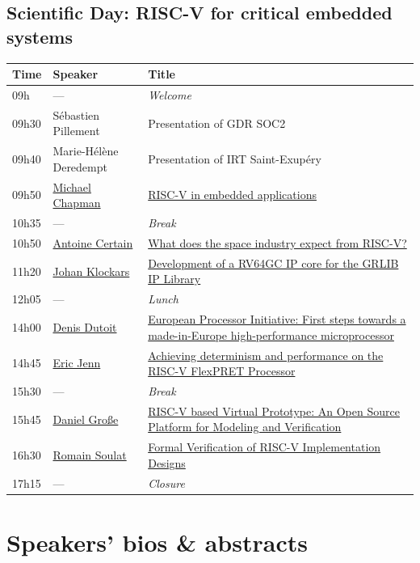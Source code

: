 \documentclass[a4paper, 10pt]{article}
\begin{document}
\subsection{Scientific Day: RISC-V for critical embedded systems}
\label{sec:orgc63f74b}

\begin{center}
\begin{tabular}{l|p{4cm}|p{11cm}}
\hline
Time & Speaker & Title\\
\hline
09h & --- & \emph{Welcome}\\
\hline
09h30 & Sébastien Pillement & Presentation of GDR SOC2\\
\hline
09h40 & Marie-Hélène Deredempt & Presentation of IRT Saint-Exupéry\\
\hline
09h50 & \hyperref[sec:orge622757]{Michael Chapman} & \hyperref[sec:orge622757]{RISC-V in embedded applications}\\
\hline
10h35 & --- & \emph{Break}\\
\hline
10h50 & \hyperref[sec:orgedcfbb5]{Antoine Certain} & \hyperref[sec:orgedcfbb5]{What does the space industry expect from RISC-V?}\\
\hline
11h20 & \hyperref[sec:orgd37d3f2]{Johan Klockars} & \hyperref[sec:orgd37d3f2]{Development of a RV64GC IP core for the GRLIB IP Library}\\
\hline
12h05 & --- & \emph{Lunch}\\
\hline
14h00 & \hyperref[sec:org6bcc10e]{Denis Dutoit} & \hyperref[sec:org6bcc10e]{European Processor Initiative: First steps towards a made-in-Europe high-performance microprocessor}\\
\hline
14h45 & \hyperref[sec:orgafaed1b]{Eric Jenn} & \hyperref[sec:orgafaed1b]{Achieving determinism and performance on the RISC-V FlexPRET Processor}\\
\hline
15h30 & --- & \emph{Break}\\
\hline
15h45 & \hyperref[sec:org05c0359]{Daniel Große} & \hyperref[sec:org05c0359]{RISC-V based Virtual Prototype: An Open Source Platform for Modeling and Verification}\\
\hline
16h30 & \hyperref[sec:org8b4a799]{Romain Soulat} & \hyperref[sec:org8b4a799]{Formal Verification of RISC-V Implementation Designs}\\
\hline
17h15 & --- & \emph{Closure}\\
\hline
\end{tabular}
\end{center}

\section{Speakers' bios \& abstracts}
\label{sec:org9be9778}
\end{document}
